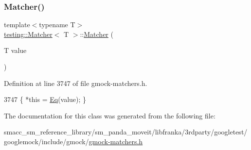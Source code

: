 \subsubsection{\texorpdfstring{Matcher()}{Matcher()}\hspace{0.1cm}{\footnotesize\ttfamily [3/3]}}
{\footnotesize\ttfamily template$<$typename T$>$ \\
\hyperlink{classtesting_1_1Matcher}{testing\+::\+Matcher}$<$ T $>$\+::\hyperlink{classtesting_1_1Matcher}{Matcher} (\begin{DoxyParamCaption}\item[{T}]{value }\end{DoxyParamCaption})}



Definition at line 3747 of file gmock-\/matchers.\+h.


\begin{DoxyCode}
3747 \{ *\textcolor{keyword}{this} = \hyperlink{namespacetesting_a0cb8ba7eae844c871eccb29e7c81635f}{Eq}(value); \}
\end{DoxyCode}


The documentation for this class was generated from the following file\+:\begin{DoxyCompactItemize}
\item 
smacc\+\_\+sm\+\_\+reference\+\_\+library/sm\+\_\+panda\+\_\+moveit/libfranka/3rdparty/googletest/googlemock/include/gmock/\hyperlink{gmock-matchers_8h}{gmock-\/matchers.\+h}\end{DoxyCompactItemize}
